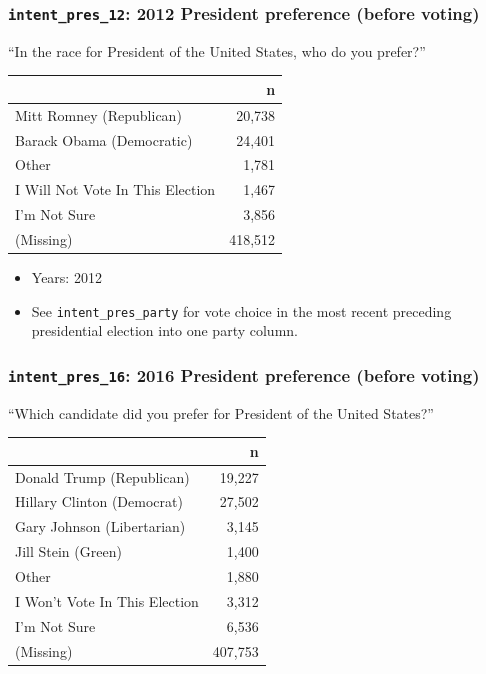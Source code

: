 \documentclass[10pt,article,oneside]{memoir}
\theoremstyle{definition}
\begin{document}
\hypertarget{intent_pres_12-2012-president-preference-before-voting}{%
\subsubsection{\texorpdfstring{\texttt{intent\_pres\_12}: 2012 President
preference (before
voting)}{intent\_pres\_12: 2012 President preference (before voting)}}\label{intent_pres_12-2012-president-preference-before-voting}}

``In the race for President of the United States, who do you prefer?''

\begin{table}[H]
\centering
\begin{tabular}{lr}
\toprule
 & n\\
\midrule
Mitt Romney (Republican) & 20,738\\
Barack Obama (Democratic) & 24,401\\
Other & 1,781\\
I Will Not Vote In This Election & 1,467\\
I'm Not Sure & 3,856\\
(Missing) & 418,512\\
\bottomrule
\end{tabular}
\end{table}

\begin{itemize}
\tightlist
\item
  Years: 2012
\item
  See \texttt{intent\_pres\_party} for vote choice in the most recent
  preceding presidential election into one party column.
\end{itemize}

\hypertarget{intent_pres_16-2016-president-preference-before-voting}{%
\subsubsection{\texorpdfstring{\texttt{intent\_pres\_16}: 2016 President
preference (before
voting)}{intent\_pres\_16: 2016 President preference (before voting)}}\label{intent_pres_16-2016-president-preference-before-voting}}

``Which candidate did you prefer for President of the United States?''

\begin{table}[H]
\centering
\begin{tabular}{lr}
\toprule
 & n\\
\midrule
Donald Trump (Republican) & 19,227\\
Hillary Clinton (Democrat) & 27,502\\
Gary Johnson (Libertarian) & 3,145\\
Jill Stein (Green) & 1,400\\
Other & 1,880\\
I Won't Vote In This Election & 3,312\\
I'm Not Sure & 6,536\\
(Missing) & 407,753\\
\bottomrule
\end{tabular}
\end{table}
\end{document}
